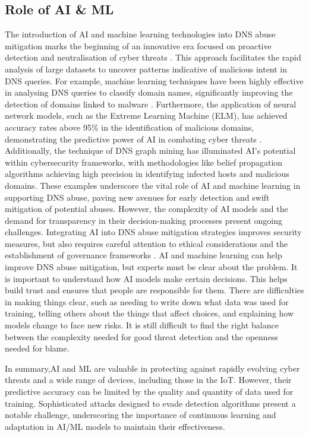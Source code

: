 \subsection{Role of AI \& ML}

The introduction of AI and machine learning technologies into DNS abuse mitigation marks the beginning of an innovative era focused on proactive detection and neutralisation of cyber threats \cite{tariq2023critical}.  This approach facilitates the rapid analysis of large datasets to uncover patterns indicative of malicious intent in DNS queries. For example, machine learning techniques have been highly effective in analysing DNS queries to classify domain names, significantly improving the detection of domains linked to malware \cite{LiMaliciousDomainDetection2020}. Furthermore, the application of neural network models, such as the Extreme Learning Machine (ELM), has achieved accuracy rates above 95\% in the identification of malicious domains, demonstrating the predictive power of AI in combating cyber threats \cite{ZouDNSGraphMining2015}. Additionally, the technique of DNS graph mining has illuminated AI's potential within cybersecurity frameworks, with methodologies like belief propagation algorithms achieving high precision in identifying infected hosts and malicious domains. These examples underscore the vital role of AI and machine learning in supporting DNS abuse, paving new avenues for early detection and swift mitigation of potential abuses. However, the complexity of AI models and the demand for transparency in their decision-making processes present ongoing challenges. Integrating AI into DNS abuse mitigation strategies improves security measures, but also requires careful attention to ethical considerations and the establishment of governance frameworks \cite{AntonakakisMalwareDomainsUpperDNS2011}. AI and machine learning can help improve DNS abuse mitigation, but experts must be clear about the problem.  It is important to understand how AI models make certain decisions. This helps build trust and ensures that people are responsible for them. There are difficulties in making things clear, such as needing to write down what data was used for training, telling others about the things that affect choices, and explaining how models change to face new risks. It is still difficult to find the right balance between the complexity needed for good threat detection and the openness needed for blame.

In summary,AI and ML are valuable in protecting against rapidly evolving cyber threats and a wide range of devices, including those in the IoT. However, their predictive accuracy can be limited by the quality and quantity of data used for training. Sophisticated attacks designed to evade detection algorithms present a notable challenge, underscoring the importance of continuous learning and adaptation in AI/ML models to maintain their effectiveness.


